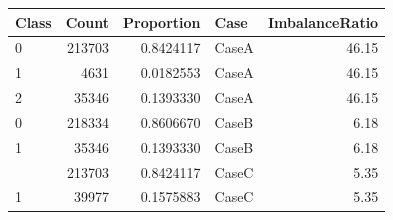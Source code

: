 
\begin{tabular}{lrrlr}
\toprule
Class & Count & Proportion & Case & ImbalanceRatio\\
\midrule
0 & 213703 & 0.8424117 & CaseA & 46.15\\
1 & 4631 & 0.0182553 & CaseA & 46.15\\
2 & 35346 & 0.1393330 & CaseA & 46.15\\
0 & 218334 & 0.8606670 & CaseB & 6.18\\
1 & 35346 & 0.1393330 & CaseB & 6.18\\
\addlinespace
0 & 213703 & 0.8424117 & CaseC & 5.35\\
1 & 39977 & 0.1575883 & CaseC & 5.35\\
\bottomrule
\end{tabular}
